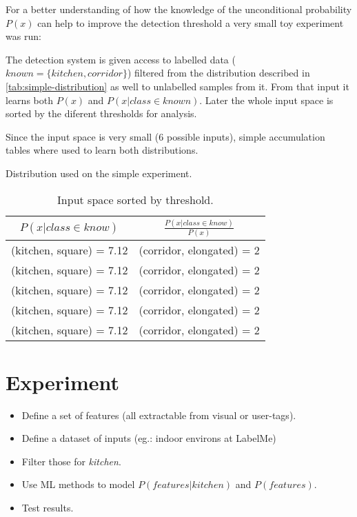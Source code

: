 \documentclass[a4paper]{article}
\begin{document}
For a better understanding of how the knowledge of the unconditional probability $P(x)$ can help to improve the detection threshold
a very small toy experiment was run:

The detection system is given access to labelled data ($known = \{kitchen, corridor\}$)
filtered from the distribution described in \autoref{tab:simple-distribution} as well to unlabelled samples from it.
From that input it learns both $P(x)$ and $P(x|class \in known)$.
Later the whole input space is sorted by the diferent thresholds for analysis.

Since the input space is very small (6 possible inputs), simple accumulation tables where used to learn both distributions.

\begin{table}[h]
\begin{center}

\end{center}
\caption{\label{tab:simple-distribution}Distribution used on the simple experiment.}
\end{table}

\begin{table}[h]
\begin{center}

\begin{tabular}{ |c| |c|}
\hline
$P(x|class \in know)$ & $\frac{P(x|class \in know)}{P(x)}$ \\ \hline
(kitchen, square) = 7.12 & (corridor, elongated) = 2 \\ \hline
(kitchen, square) = 7.12 & (corridor, elongated) = 2 \\ \hline
(kitchen, square) = 7.12 & (corridor, elongated) = 2 \\ \hline
(kitchen, square) = 7.12 & (corridor, elongated) = 2 \\ \hline
(kitchen, square) = 7.12 & (corridor, elongated) = 2 \\ \hline
\end{tabular}

\end{center}
\caption{\label{tab:simple-threshold}Input space sorted by threshold.}
\end{table}
\section{Experiment}
\label{sec:experiment}

\begin{itemize}
\item Define a set of features (all extractable from visual or user-tags).
\item Define a dataset of inputs (eg.: indoor environs at LabelMe)
\item Filter those for \emph{kitchen}.
\item Use ML methods to model $P(features | kitchen)$ and $P(features)$.
\item Test results.
\end{itemize}



\end{document}
